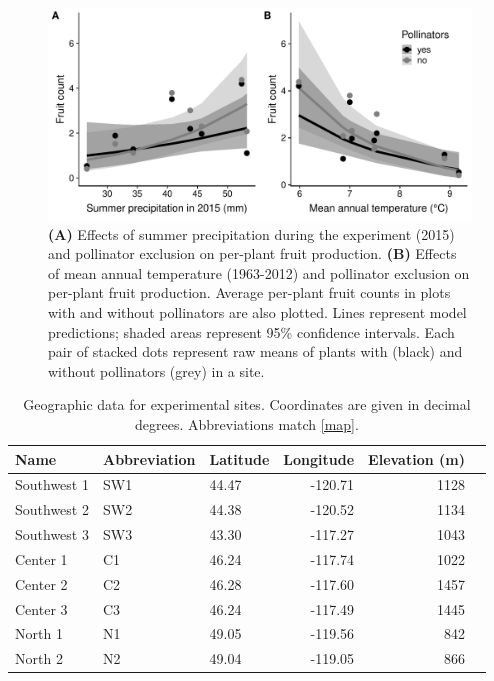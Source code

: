\documentclass{article}
\newcommand{\beginsupplement}{%
        \setcounter{table}{0}
        \renewcommand{\thetable}{S\arabic{table}}%
        \setcounter{figure}{0}
        \renewcommand{\thefigure}{S\arabic{figure}}%
     }
\begin{document}
\clearpage


\begin{figure}[p]
\centering
\includegraphics[width = \textwidth]{figs/fruit_climate}
\caption[Effects of climate and pollinator exclusion on per-plant fruit production]{\textbf{(A)} Effects of summer precipitation during the experiment (2015) and pollinator exclusion on per-plant fruit production. \textbf{(B)} Effects of mean annual temperature (1963-2012) and pollinator exclusion on per-plant fruit production. Average per-plant fruit counts in plots with and without pollinators are also plotted. Lines represent model predictions; shaded areas represent 95\% confidence intervals. Each pair of stacked dots represent raw means of plants with (black) and without pollinators (grey) in a site.}
\label{fruitsclimate}
\end{figure}


\beginsupplement


\clearpage

\begin{table}[p]
\centering
\captionsetup{singlelinecheck = false, justification=justified}
\caption[Geographic data for experimental sites]{Geographic data for experimental sites. Coordinates are given in decimal degrees. Abbreviations match \autoref{map}.}
\begin{tabular}{lllrrr}
\toprule
Name        & Abbreviation & Latitude & Longitude & Elevation (m) \\
\midrule
Southwest 1 & SW1         & 44.47   & -120.71  & 1128          \\ %
Southwest 2 & SW2         & 44.38   & -120.52  & 1134          \\ %
Southwest 3 & SW3         & 43.30   & -117.27  & 1043          \\ %
Center 1    & C1          & 46.24   & -117.74  & 1022          \\ %
Center 2    & C2          & 46.28   & -117.60  & 1457          \\ %
Center 3    & C3          & 46.24   & -117.49  & 1445          \\ %
North 1     & N1          & 49.05    & -119.56   & 842         \\ %
North 2     & N2          & 49.04    & -119.05   & 866         \\ %
\bottomrule
\end{tabular}
\label{siteinfo}
\end{table}
\end{document}
